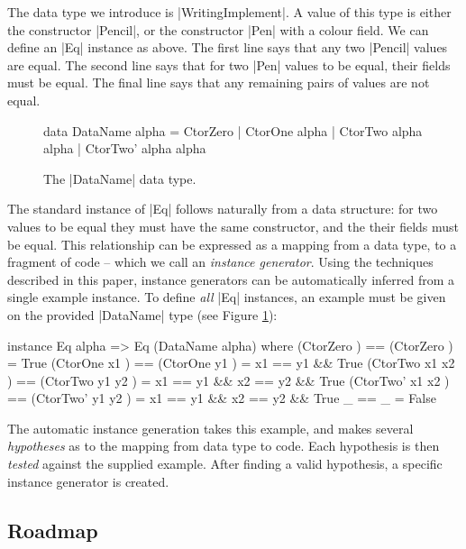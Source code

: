\documentclass{llncs}
\begin{document}
The data type we introduce is |WritingImplement|. A value of this type is either the constructor |Pencil|, or the constructor |Pen| with a colour field. We can define an |Eq| instance as above. The first line says that any two |Pencil| values are equal. The second line says that for two |Pen| values to be equal, their fields must be equal. The final line says that any remaining pairs of values are not equal.

\begin{figure}
\begin{code}
data DataName alpha  =  CtorZero
                     |  CtorOne   alpha
                     |  CtorTwo   alpha  alpha
                     |  CtorTwo'  alpha  alpha
\end{code}
\caption{The |DataName| data type.}
\label{fig:dataname}
\end{figure}

The standard instance of |Eq| follows naturally from a data structure: for two values to be equal they must have the same constructor, and the their fields must be equal. This relationship can be expressed as a mapping from a data type, to a fragment of code -- which we call an \textit{instance generator}. Using the techniques described in this paper, instance generators can be automatically inferred from a single example instance. To define \textit{all} |Eq| instances, an example must be given on the provided |DataName| type (see Figure \ref{fig:dataname}):

\begin{code}
instance Eq alpha => Eq (DataName alpha) where
    (CtorZero         )  == (CtorZero         )  = True
    (CtorOne   x1     )  == (CtorOne   y1     )  = x1 == y1 && True
    (CtorTwo   x1 x2  )  == (CtorTwo   y1 y2  )  = x1 == y1 && x2 == y2 && True
    (CtorTwo'  x1 x2  )  == (CtorTwo'  y1 y2  )  = x1 == y1 && x2 == y2 && True
    _                    == _                    = False
\end{code}

The automatic instance generation takes this example, and makes several \textit{hypotheses} as to the mapping from data type to code. Each hypothesis is then \textit{tested} against the supplied example. After finding a valid hypothesis, a specific instance generator is created.

\subsection{Roadmap}
\end{document}
